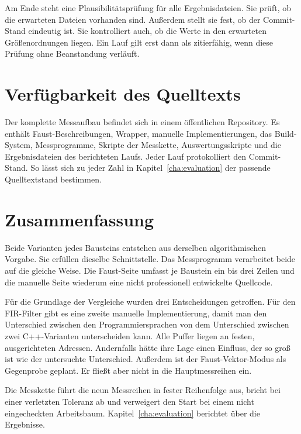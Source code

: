 Am Ende steht eine Plausibilitätsprüfung für alle Ergebnisdateien. Sie prüft, ob die erwarteten Dateien vorhanden sind. Außerdem stellt sie fest, ob der Commit-Stand eindeutig ist. Sie kontrolliert auch, ob die Werte in den erwarteten Größenordnungen liegen. Ein Lauf gilt erst dann als zitierfähig, wenn diese Prüfung ohne Beanstandung verläuft.

\section{Verfügbarkeit des Quelltexts}
\label{sec:verfuegbarkeit}

Der komplette Messaufbau befindet sich in einem öffentlichen Repository. Es enthält Faust-Beschreibungen, Wrapper, manuelle Implementierungen, das Build-System, Messprogramme, Skripte der Messkette, Auswertungsskripte und die Ergebnisdateien des berichteten Laufs. Jeder Lauf protokolliert den Commit-Stand. So lässt sich zu jeder Zahl in Kapitel~\ref{cha:evaluation} der passende Quelltextstand bestimmen.

\section{Zusammenfassung}
\label{sec:implementierung-zusammenfassung}

Beide Varianten jedes Bausteins entstehen aus derselben algorithmischen Vorgabe. Sie erfüllen dieselbe Schnittstelle. Das Messprogramm verarbeitet beide auf die gleiche Weise. Die Faust-Seite umfasst je Baustein ein bis drei Zeilen und die manuelle Seite wiederum eine nicht professionell entwickelte Quellcode. 

Für die Grundlage der Vergleiche wurden drei Entscheidungen getroffen.
Für den FIR-Filter gibt es eine zweite manuelle Implementierung, damit man den Unterschied zwischen den Programmiersprachen von dem Unterschied zwischen zwei C++-Varianten unterscheiden kann. Alle Puffer liegen an festen, ausgerichteten Adressen. Andernfalls hätte ihre Lage einen Einfluss, der so groß ist wie der untersuchte Unterschied. Außerdem ist der Faust-Vektor-Modus als Gegenprobe geplant. Er fließt aber nicht in die Hauptmessreihen ein.

Die Messkette führt die neun Messreihen in fester Reihenfolge aus, bricht bei einer verletzten Toleranz ab und verweigert den Start bei einem nicht eingecheckten Arbeitsbaum. Kapitel~\ref{cha:evaluation} berichtet über die Ergebnisse.